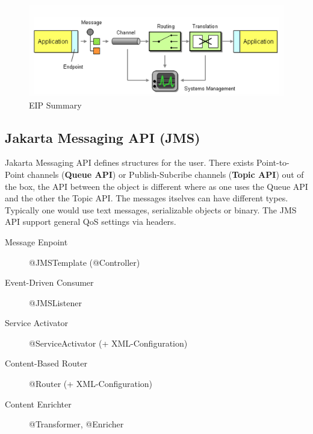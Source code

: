 \documentclass[../Main.tex]{subfiles}
\begin{document}
\begin{figure}[H]
    \centering
    \includegraphics[width=0.75\linewidth]{Images/eip-overview.png}
    \caption{EIP Summary}
\end{figure}
\newpage
\subsection{Jakarta Messaging API (JMS)}
Jakarta Messaging API defines structures for the user. There exists Point-to-Point channels (\textbf{Queue API}) or 
Publish-Subcribe channels (\textbf{Topic API}) out of the box, the API between the object is different where as one uses the 
Queue API and the other the Topic API. The messages itselves can have different types. Typically one would 
use text messages, serializable objects or binary. The JMS API support general QoS settings via headers.

\begin{description}
    \item[Message Enpoint] @JMSTemplate (@Controller)
    \item[Event-Driven Consumer] @JMSListener
    \item[Service Activator] @ServiceActivator (+ XML-Configuration)
    \item[Content-Based Router] @Router (+ XML-Configuration)
    \item[Content Enrichter] @Transformer, @Enricher
\end{description}

\newpage
\end{document}
